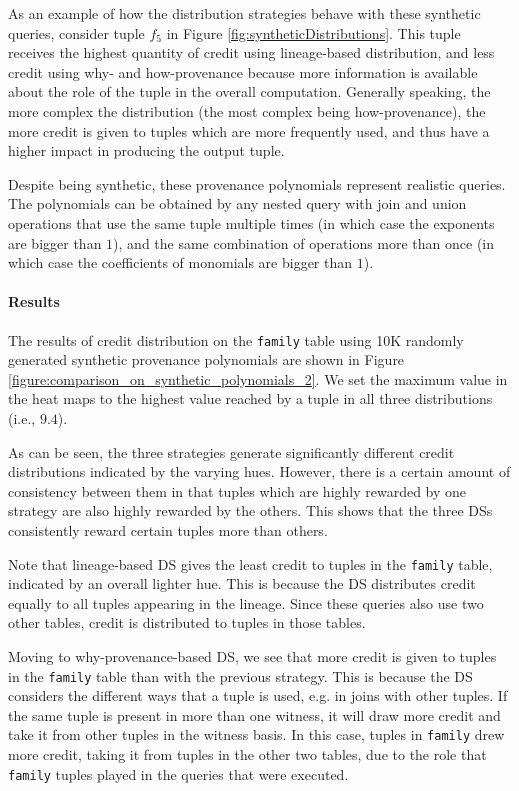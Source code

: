 As an example of how the distribution strategies behave with these synthetic queries, consider tuple $f_5$ in Figure \ref{fig:syntheticDistributions}.
This tuple receives the highest quantity of credit using lineage-based distribution, and less credit using why- and how-provenance because more information is available about the role of the tuple in the overall computation. 
Generally speaking, the more complex the distribution (the most complex being how-provenance), the more credit is given to tuples which are more frequently used, and thus have a higher impact in producing the output tuple. 

Despite being synthetic, these provenance polynomials represent realistic queries.  The polynomials can be obtained by any nested query with join and union operations that use the same tuple multiple times (in which case the exponents are bigger than $1$), and the same combination of operations more than once (in which case the coefficients of monomials are bigger than $1$). 

\paragraph{Results} The results of credit distribution on the \texttt{family} table using 10K randomly generated synthetic provenance polynomials are shown in
Figure \ref{figure:comparison_on_synthetic_polynomials_2}. 
We set the maximum value in the heat maps to the highest value reached by a tuple in all three distributions (i.e., $9.4$). 

As can be seen, the three strategies generate significantly different credit distributions indicated by the varying hues. 
However, there is a certain amount of consistency between them in that tuples which are highly rewarded by one strategy are also highly rewarded by the others. This shows that the three DSs consistently reward certain tuples more than others. 

Note that lineage-based DS gives the least credit to tuples in the \texttt{family} table, indicated by an overall lighter hue. This is because the DS  distributes credit equally to all tuples appearing in the lineage. Since these queries also use two other tables, credit is distributed to tuples in those tables.

Moving to why-provenance-based DS, we see that more credit is given to tuples in the \texttt{family} table than with the previous strategy. This is because the DS considers the different ways that a tuple is used, e.g. in joins with other tuples. If the same tuple is present in more than one witness, it will draw more credit and take it from  other tuples in the witness basis. In this case, tuples in \texttt{family} drew more credit, taking it from tuples in the other two tables, due to the role that \texttt{family}  tuples played in the queries that were executed.  


